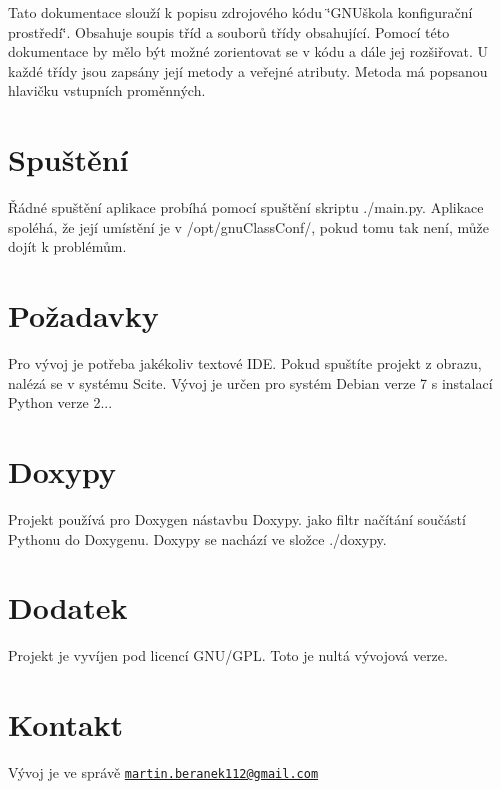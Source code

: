 Tato dokumentace slouží k popisu zdrojového kódu \char`\"{}\-G\-N\-Uškola konfigurační prostředí\char`\"{}. Obsahuje soupis tříd a souborů třídy obsahující. Pomocí této dokumentace by mělo být možné zorientovat se v kódu a dále jej rozšiřovat. U každé třídy jsou zapsány její metody a veřejné atributy. Metoda má popsanou hlavičku vstupních proměnných.\hypertarget{index_Spuštění}{}\section{Spuštění}\label{index_Spuštění}
Řádné spuštění aplikace probíhá pomocí spuštění skriptu ./main.py. Aplikace spoléhá, že její umístění je v /opt/gnu\-Class\-Conf/, pokud tomu tak není, může dojít k problémům.\hypertarget{index_Požadavky}{}\section{Požadavky}\label{index_Požadavky}
Pro vývoj je potřeba jakékoliv textové I\-D\-E. Pokud spuštíte projekt z obrazu, nalézá se v systému Scite. Vývoj je určen pro systém Debian verze 7 s instalací Python verze 2...\hypertarget{index_Doxypy}{}\section{Doxypy}\label{index_Doxypy}
Projekt používá pro Doxygen nástavbu Doxypy. jako filtr načítání součástí Pythonu do Doxygenu. Doxypy se nachází ve složce ./doxypy.\hypertarget{index_Dodatek}{}\section{Dodatek}\label{index_Dodatek}
Projekt je vyvíjen pod licencí G\-N\-U/\-G\-P\-L. Toto je nultá vývojová verze.\hypertarget{index_Kontakt}{}\section{Kontakt}\label{index_Kontakt}
Vývoj je ve správě \href{mailto:martin.beranek112@gmail.com}{\tt martin.\-beranek112@gmail.\-com} 
